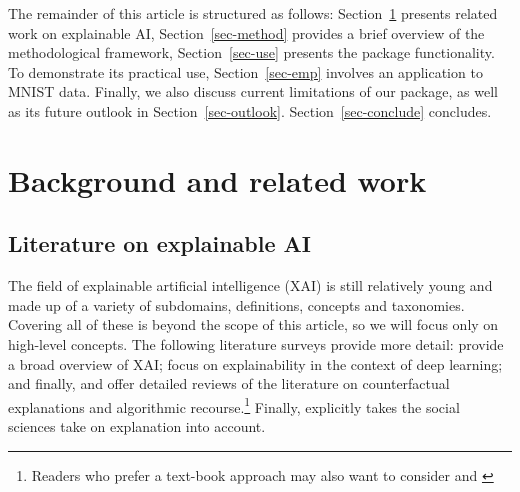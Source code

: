 \documentclass{juliacon}
\begin{document}
The remainder of this article is structured as follows:
Section~\ref{sec-related} presents related work on explainable AI,
Section~\ref{sec-method} provides a brief overview of the methodological
framework, Section~\ref{sec-use} presents the package functionality. To
demonstrate its practical use, Section~\ref{sec-emp} involves an
application to MNIST data. Finally, we also discuss current limitations
of our package, as well as its future outlook in
Section~\ref{sec-outlook}. Section~\ref{sec-conclude} concludes.

\hypertarget{sec-related}{%
\section{Background and related work}\label{sec-related}}

\hypertarget{literature-on-explainable-ai}{%
\subsection{Literature on explainable
AI}\label{literature-on-explainable-ai}}

The field of explainable artificial intelligence (XAI) is still
relatively young and made up of a variety of subdomains, definitions,
concepts and taxonomies. Covering all of these is beyond the scope of
this article, so we will focus only on high-level concepts. The
following literature surveys provide more detail:
\cite{arrieta2020explainable} provide a broad overview of XAI;
\cite{fan2020interpretability} focus on explainability in the context of
deep learning; and finally, \cite{karimi2020survey} and
\cite{verma2020counterfactual} offer detailed reviews of the literature
on counterfactual explanations and algorithmic recourse.\footnote{Readers
  who prefer a text-book approach may also want to consider
  \cite{molnar2020interpretable} and \cite{varshney2022trustworthy}}
Finally, \cite{miller2019explanation} explicitly takes the social
sciences take on explanation into account.
\end{document}
